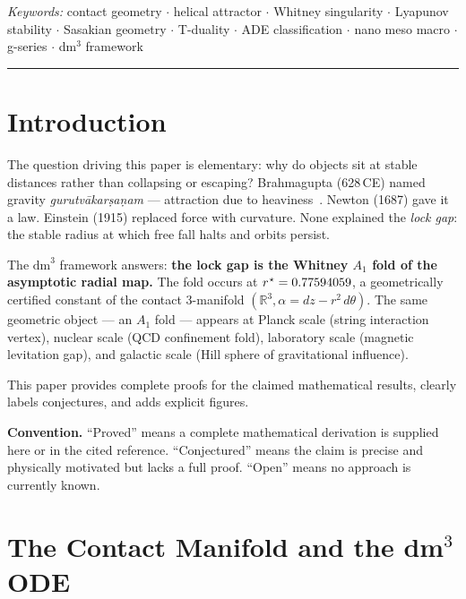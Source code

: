 \documentclass[12pt,a4paper]{article}
\theoremstyle{plain}
\theoremstyle{definition}
\theoremstyle{remark}
\newcommand{\dm}{\mathrm{dm}^3}
\newcommand{\rstar}{r^{\kern0.5pt\star}}
\begin{document}
\smallskip
\noindent\textit{Keywords:} contact geometry $\cdot$ helical attractor $\cdot$
Whitney singularity $\cdot$ Lyapunov stability $\cdot$ Sasakian geometry $\cdot$
T-duality $\cdot$ ADE classification $\cdot$ nano meso macro $\cdot$ g-series $\cdot$
dm$^3$ framework

\rule{\linewidth}{0.4pt}

\section{Introduction}

The question driving this paper is elementary: why do objects sit at stable distances
rather than collapsing or escaping?
Brahmagupta (628\,CE) named gravity \textit{gurutvākarṣaṇam} — attraction due to
heaviness~\cite{Roy1975}.
Newton (1687) gave it a law.
Einstein (1915) replaced force with curvature.
None explained the \emph{lock gap}: the stable radius at which free fall halts and
orbits persist.

The $\dm$ framework answers: \textbf{the lock gap is the Whitney $A_1$ fold of the
asymptotic radial map.}
The fold occurs at $\rstar=0.77594059$, a geometrically certified constant of the
contact 3-manifold $(\mathbb{R}^3,\alpha=dz-r^2\,d\theta)$.
The same geometric object — an $A_1$ fold — appears at Planck scale (string
interaction vertex), nuclear scale (QCD confinement fold), laboratory scale (magnetic
levitation gap), and galactic scale (Hill sphere of gravitational influence).

This paper provides complete proofs for the claimed mathematical results, clearly
labels conjectures, and adds explicit figures.

\medskip\noindent
\textbf{Convention.}
``Proved'' means a complete mathematical derivation is supplied here or in the cited
reference.
``Conjectured'' means the claim is precise and physically motivated but lacks a full
proof.
``Open'' means no approach is currently known.

\section{The Contact Manifold and the dm$^3$ ODE}
\label{sec:ode}
\end{document}
